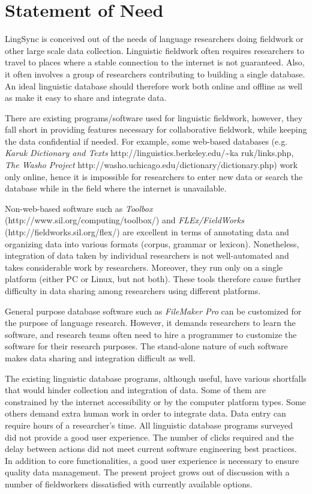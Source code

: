 \documentclass[12pt]{article}
\begin{document}
\section {Statement of Need}

LingSync is conceived out of the needs of language researchers doing fieldwork or other large scale data collection. Linguistic fieldwork often requires researchers to travel to places where a stable connection to the internet is not guaranteed. Also, it often involves a group of researchers contributing to building a single database.
 An ideal linguistic database should therefore work both online and offline as well as make it easy to share and integrate data. 
 
There are existing programs/software used for linguistic fieldwork, 
however, they fall short in providing features necessary for collaborative fieldwork, while keeping the data confidential if needed. 
For example, some web-based databases (e.g.  {\it Karuk Dictionary and Texts} http://linguistics.berkeley.edu/{\textasciitilde}ka
ruk/links.php,   {\it The Washo Project} http://washo.uchicago.edu/dictionary/dictionary.php) work only online, hence it is impossible for researchers to enter new data or search the database while in the field where the internet is unavailable.  

Non-web-based software such as {\it Toolbox} (http://www.sil.org/computing/toolbox/) and {\it FLEx/FieldWorks} (http://fieldworks.sil.org/flex/)
are excellent in terms of annotating data and organizing data into various formats (corpus, grammar or lexicon). Nonetheless, integration of data taken by individual researchers is not well-automated and takes considerable work by researchers. Moreover, they run only on a single platform (either PC or Linux, but not both). These tools therefore cause further difficulty in data sharing among researchers using different platforms.  

General purpose database software such as {\it FileMaker Pro} can be customized for the purpose of language research. However, it demands researchers to learn the software, and research teams often need to hire a programmer to customize the software for their research purposes. The stand-alone nature of such software makes data sharing and integration difficult as well. 

The existing linguistic database programs, although useful, have various shortfalls that would hinder collection and integration of data. Some of them are constrained by the internet accessibility or by the computer platform types. Some others demand extra human work in order to integrate data. Data entry can require hours of a researcher's time. All linguistic database programs surveyed did not provide a good user experience. The number of clicks required and the delay between actions did not meet current software engineering best practices. In addition to core functionalities, a good user experience is necessary to ensure quality data management.
The present project grows out of discussion with a number of fieldworkers dissatisfied with currently available options. 
\end{document}
